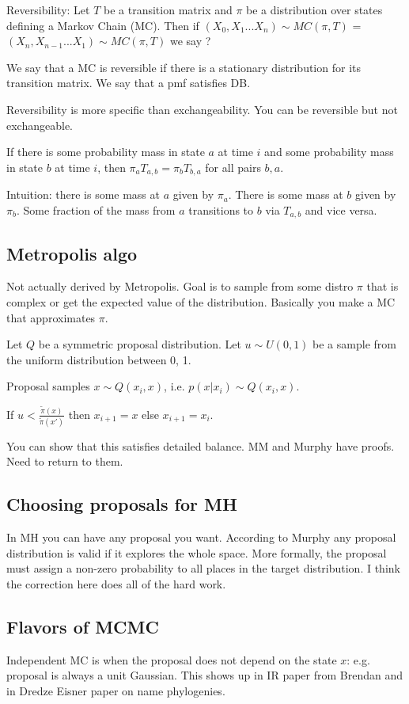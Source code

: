 \documentclass[12pt]{amsart}
\begin{document}
Reversibility:  Let $T$ be a transition matrix and $\pi$ be a distribution over states defining a Markov Chain (MC). Then if $(X_0, X_1 ... X_n) \sim MC(\pi, T)$ = $(X_n, X_{n -1} ... X_1) \sim MC(\pi, T)$ we say ? 

We say that a MC is reversible if there is a stationary distribution for its transition matrix. We say that a pmf satisfies DB. 

Reversibility is more specific than exchangeability. You can be reversible but not exchangeable. 

If there is some probability mass in state $a$ at time $i$ and some probability mass in state $b$ at time $i$, then $\pi_a T_{a,b} = \pi_b T_{b,a}$ for all pairs $b,a$.

Intuition: there is some mass at $a$ given by $\pi_a$. There is some mass at $b$ given by $\pi_b$. Some fraction of the mass from $a$ transitions to $b$ via $T_{a,b}$ and vice versa. 

\subsection{Metropolis algo}
Not actually derived by Metropolis. Goal is to sample from some distro $\pi$ that is complex or get the expected value of the distribution. Basically you make a MC that approximates $\pi$. 

Let $Q$ be a symmetric proposal distribution. Let $u \sim U(0,1)$ be a sample from the uniform distribution between 0, 1.

Proposal samples $x \sim Q(x_i, x)$, i.e. $p(x | x_i) \sim Q(x_i, x)$. 

If $u < \frac{\widetilde{\pi}(x)}{\widetilde{\pi}(x')}$ then $x_{i+1} = x$ else $x_{i+ 1} = x_i$.

You can show that this satisfies detailed balance. MM and Murphy have proofs. Need to return to them.

\subsection{Choosing proposals for MH}
In MH you can have any proposal you want. According to Murphy any proposal distribution is valid if it explores the whole space. More formally, the proposal must assign a non-zero probability to all places in the target distribution. I think the correction here does all of the hard work.

\subsection{Flavors of MCMC}
Independent MC is when the proposal does not depend on the state $x$: e.g. proposal is always a unit Gaussian. This shows up in IR paper from Brendan and in Dredze Eisner paper on name phylogenies. 
\end{document}
